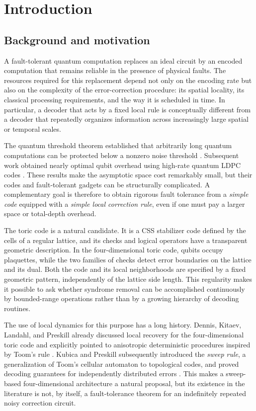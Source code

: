\section{Introduction}

\subsection{Background and motivation}

A fault-tolerant quantum computation replaces an ideal circuit by an encoded computation that remains reliable in the presence of physical faults.  The resources required for this replacement depend not only on the encoding rate but also on the complexity of the error-correction procedure: its spatial locality, its classical processing requirements, and the way it is scheduled in time.  In particular, a decoder that acts by a fixed local rule is conceptually different from a decoder that repeatedly organizes information across increasingly large spatial or temporal scales.

The quantum threshold theorem established that arbitrarily long quantum computations can be protected below a nonzero noise threshold \cite{aharonov1999faulttolerant,Ninequ}.  Subsequent work obtained nearly optimal qubit overhead using high-rate quantum LDPC codes \cite{gottesman2014faulttolerant,grospellier:tel-03364419,Fawzi_2018,nguyen2025quantumfaulttoleranceconstantspace}.  These results make the asymptotic space cost remarkably small, but their codes and fault-tolerant gadgets can be structurally complicated.  A complementary goal is therefore to obtain rigorous fault tolerance from a \emph{simple code} equipped with a \emph{simple local correction rule}, even if one must pay a larger space or total-depth overhead.

The toric code is a natural candidate.  It is a CSS stabilizer code defined by the cells of a regular lattice, and its checks and logical operators have a transparent geometric description.  In the four-dimensional toric code, qubits occupy plaquettes, while the two families of checks detect error boundaries on the lattice and its dual.  Both the code and its local neighborhoods are specified by a fixed geometric pattern, independently of the lattice side length.  This regularity makes it possible to ask whether syndrome removal can be accomplished continuously by bounded-range operations rather than by a growing hierarchy of decoding routines.

The use of local dynamics for this purpose has a long history.  Dennis, Kitaev, Landahl, and Preskill already discussed local recovery for the four-dimensional toric code and explicitly pointed to anisotropic deterministic procedures inspired by Toom's rule \cite{Dennis2002}.  Kubica and Preskill subsequently introduced the \emph{sweep rule}, a generalization of Toom's cellular automaton to topological codes, and proved decoding guarantees for independently distributed errors \cite{Kubica_2019}.  This makes a sweep-based four-dimensional architecture a natural proposal, but its existence in the literature is not, by itself, a fault-tolerance theorem for an indefinitely repeated noisy correction circuit.

